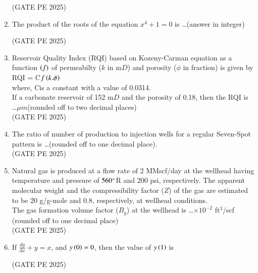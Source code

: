 \documentclass[journal,12pt,onecolumn]{IEEEtran}
\theoremstyle{remark}
\begin{document}
\begin{enumerate}
\hfill{(GATE PE 2025)}

\item The product of the roots of the equation $x^4+1=0$ is \dots (answer in integer)

\hfill{(GATE PE 2025)}

\item Reservoir Quality Index (RQI) based on Kozeny-Carman equation as a function $\left(f\right)$ of permeabilty ($k$ in m$D$) and porosity ($\phi$ in fraction) is given by\\
RQI = C$f\left(k.\phi\right)$\\
where, Cis a constant with a value of 0.0314.\\
If a carbonate reservoir of 152 m$D$ and the porosity of 0.18, then the RQI is \dots $\mu m$(rounded off to two decimal places)\\

\hfill{(GATE PE 2025)}

\item The ratio of number of production to injection wells for a regular Seven-Spot pattern is \dots(rounded off to one decimal place).\\

\hfill{(GATE PE 2025)}

\item Natural gas is produced at a flow rate of 2 MMscf/day at the wellhead having temperature and pressure of $560\degree$R and 200 psi, respectively. The apparent molecular weight and the compressibility factor ($Z$) of the gas are estimated to be
20 g/g-mole and 0.8, respectively, at wellhead conditions.\\
The gas formation volume factor ($B_g$) at the wellhead
is \dots$\times10^{-2}$ ft$^3$/scf (rounded off to one decimal place)\\

\hfill{(GATE PE 2025)}

\item If $\frac{dy}{dx}+y=x$, and $y\left(0\right)=0$, then the value of $y\left(1\right)$ is 
\begin{enumerate}
\end{enumerate}
\hfill{(GATE PE 2025)}


\end{enumerate}
\end{document}
